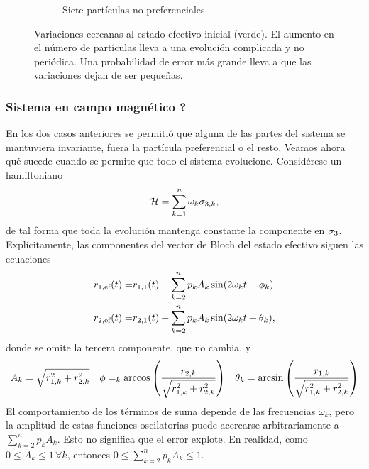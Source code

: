 \begin{figure}[ht!]
\begin{subfigure}{0.5\textwidth}
      \caption{Siete partículas no preferenciales.}
    \end{subfigure}
    \caption{Variaciones cercanas al estado efectivo inicial (verde). El aumento en el número de partículas lleva a una evolución complicada y no periódica. Una probabilidad de error más grande lleva a que las variaciones dejan de ser pequeñas.}\label{fig:PrefInv2}
\end{figure}

\subsubsection{Sistema en campo magnético ?}


En los dos casos anteriores se permitió que alguna de las partes del sistema se mantuviera invariante, fuera la partícula preferencial o el resto. Veamos ahora qué sucede cuando se permite que todo el sistema evolucione. Considérese un hamiltoniano
\begin{equation}
    \mathcal{H}=\sum_{k=1}^{n}\omega_{k}\sigma_{3,k},\nonumber
\end{equation}
de tal forma que toda la evolución mantenga constante la componente en $\sigma_{3}$. Explícitamente, las componentes del vector de Bloch del estado efectivo siguen las ecuaciones
\begin{align}
    r_{1,\text{ef}}(t)=&r_{1,1}(t)-\sum_{k=2}^{n}p_{k}A_{k}\sin(2\omega_{k} t-\phi_{k})\nonumber\\
    r_{2,\text{ef}}(t)=&r_{2,1}(t)+\sum_{k=2}^{n}p_{k}A_{k}\sin(2\omega_{k} t+\theta_{k}),\nonumber
\end{align}
donde se omite la tercera componente, que no cambia, y
\begin{align}
    A_{k}=\sqrt{r_{1,k}^{2}+r_{2,k}^{2}} & & \phi=_{k}\arccos\qty(\frac{r_{2,k}}{\sqrt{r_{1,k}^{2}+r_{2,k}^{2}}}) & & \theta_{k}=\arcsin\qty(\frac{r_{1,k}}{\sqrt{r_{1,k}^{2}+r_{2,k}^{2}}})\nonumber
\end{align}
El comportamiento de los términos de suma depende de las frecuencias $\omega_{k}$, pero la amplitud de estas funciones oscilatorias puede acercarse arbitrariamente a $\sum_{k=2}^{n} p_{k} A_{k}$. Esto no significa que el error explote. En realidad, como $0\leq A_{k}\leq 1\,\forall k$, entonces $0\leq\sum_{k=2}^{n} p_{k} A_{k}\leq 1$. 


